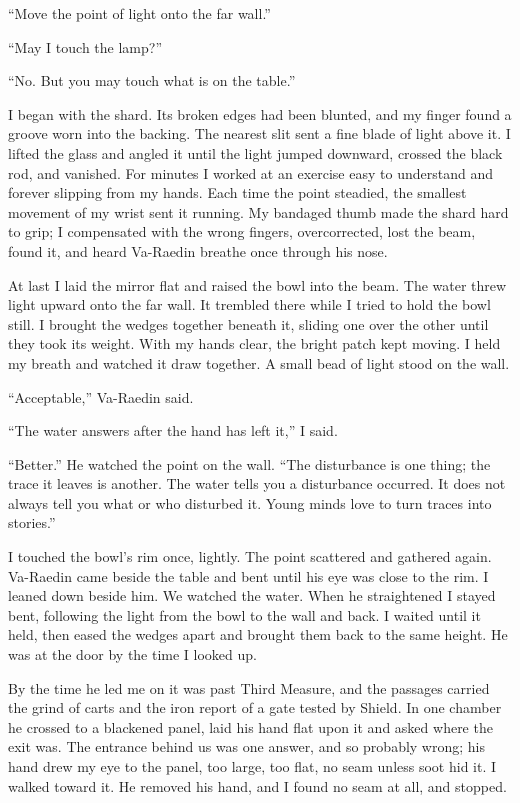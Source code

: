 ``Move the point of light onto the far wall.''\par
``May I touch the lamp?''\par
``No. But you may touch what is on the table.''\par

I began with the shard. Its broken edges had been blunted, and my finger found a groove worn into the backing. The nearest slit sent a fine blade of light above it. I lifted the glass and angled it until the light jumped downward, crossed the black rod, and vanished. For minutes I worked at an exercise easy to understand and forever slipping from my hands. Each time the point steadied, the smallest movement of my wrist sent it running. My bandaged thumb made the shard hard to grip; I compensated with the wrong fingers, overcorrected, lost the beam, found it, and heard Va-Raedin breathe once through his nose.\par

At last I laid the mirror flat and raised the bowl into the beam. The water threw light upward onto the far wall. It trembled there while I tried to hold the bowl still. I brought the wedges together beneath it, sliding one over the other until they took its weight. With my hands clear, the bright patch kept moving. I held my breath and watched it draw together. A small bead of light stood on the wall.\par

``Acceptable,'' Va-Raedin said.\par
``The water answers after the hand has left it,'' I said.\par
``Better.'' He watched the point on the wall. ``The disturbance is one thing; the trace it leaves is another. The water tells you a disturbance occurred. It does not always tell you what or who disturbed it. Young minds love to turn traces into stories.''\par

I touched the bowl's rim once, lightly. The point scattered and gathered again. Va-Raedin came beside the table and bent until his eye was close to the rim. I leaned down beside him. We watched the water. When he straightened I stayed bent, following the light from the bowl to the wall and back. I waited until it held, then eased the wedges apart and brought them back to the same height. He was at the door by the time I looked up.\par

\ornament

By the time he led me on it was past Third Measure, and the passages carried the grind of carts and the iron report of a gate tested by Shield. In one chamber he crossed to a blackened panel, laid his hand flat upon it and asked where the exit was. The entrance behind us was one answer, and so probably wrong; his hand drew my eye to the panel, too large, too flat, no seam unless soot hid it. I walked toward it. He removed his hand, and I found no seam at all, and stopped.\par

